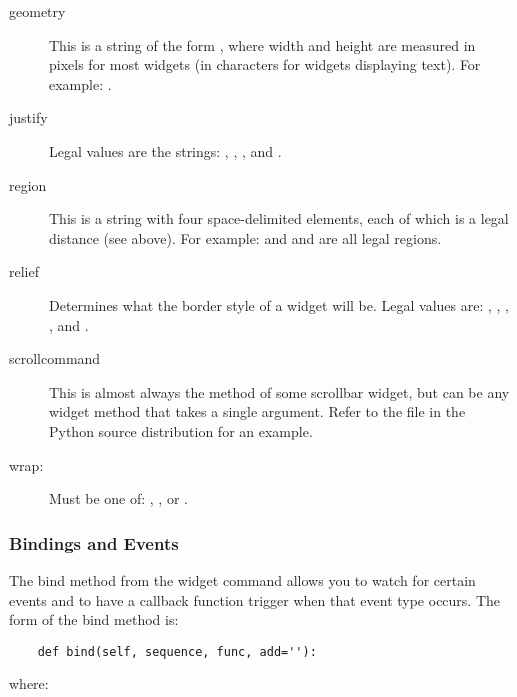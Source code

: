 \begin{description}
\item[geometry]
This is a string of the form , where
width and height are measured in pixels for most widgets (in
characters for widgets displaying text).  For example:
.

\item[justify]
Legal values are the strings: ,
, , and .

\item[region]
This is a string with four space-delimited elements, each of
which is a legal distance (see above).  For example:  and  and  
are all legal regions.

\item[relief]
Determines what the border style of a widget will be.  Legal
values are: , ,
, , and .

\item[scrollcommand]
This is almost always the  method of some scrollbar
widget, but can be any widget method that takes a single argument.  
Refer to the file 
in the Python source distribution for an example.

\item[wrap:]
Must be one of: , , or .
\end{description}


\subsubsection{Bindings and Events} %


The bind method from the widget command allows you to watch for
certain events and to have a callback function trigger when that event
type occurs.  The form of the bind method is:

\begin{verbatim}
    def bind(self, sequence, func, add=''):
\end{verbatim}
where:

